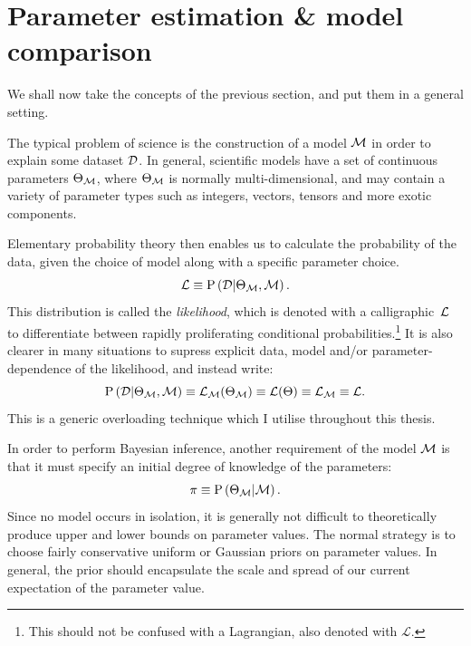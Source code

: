 \section{Parameter estimation \& model comparison}
\label{sec:bay:model_comp}
We shall now take the concepts of the previous section, and put them in a general setting. 

The typical problem of science is the construction of a model \(\mathcal{M}\) in order to explain some dataset \(\mathcal{D}\). In general, scientific models have a set of continuous parameters \(\Theta_{\mathcal{M}}\), where \(\Theta_{\mathcal{M}}\) is normally multi-dimensional, and may contain a variety of parameter types such as integers, vectors, tensors and more exotic components.

Elementary probability theory then enables us to calculate the probability of the data, given the choice of model along with a specific parameter choice.
\begin{equation}
  \mathcal{L}\equiv\mathrm{P}\left(\mathcal{D}\middle|\Theta_{\mathcal{M}},\mathcal{M}\right).
  \label{eqn:bay:lik_def}
\end{equation}
This distribution is called the {\em likelihood}, which is denoted with a calligraphic~\(\mathcal{L}\) to differentiate between rapidly proliferating conditional probabilities.\footnote{This should not be confused with a Lagrangian, also denoted with \(\mathcal{L}\).} It is also clearer in many situations to supress explicit data, model and/or parameter-dependence of the likelihood, and instead write:
\begin{equation}
  \mathrm{P}\left(\mathcal{D}\middle|\Theta_{\mathcal{M}},\mathcal{M}\right)
  \equiv
  \mathcal{L}_{\mathcal{M}}(\Theta_{\mathcal{M}})
  \equiv
  \mathcal{L}(\Theta)
  \equiv
  \mathcal{L}_{\mathcal{M}}
  \equiv
  \mathcal{L}.\nonumber
\end{equation}
This is a generic overloading technique which I utilise throughout this thesis.

In order to perform Bayesian inference, another requirement of the model \(\mathcal{M}\) is that it must specify an initial degree of knowledge of the parameters:
\begin{equation}
  \pi\equiv\mathrm{P}\left(\Theta_{\mathcal{M}}\middle|\mathcal{M}\right).
  \label{eqn:bay:prior_def}
\end{equation}
Since no model occurs in isolation, it is generally not difficult to theoretically produce upper and lower bounds on parameter values. The normal strategy is to choose fairly conservative uniform or Gaussian priors on parameter values. In general, the prior should encapsulate the scale and spread of our current expectation of the parameter value.

